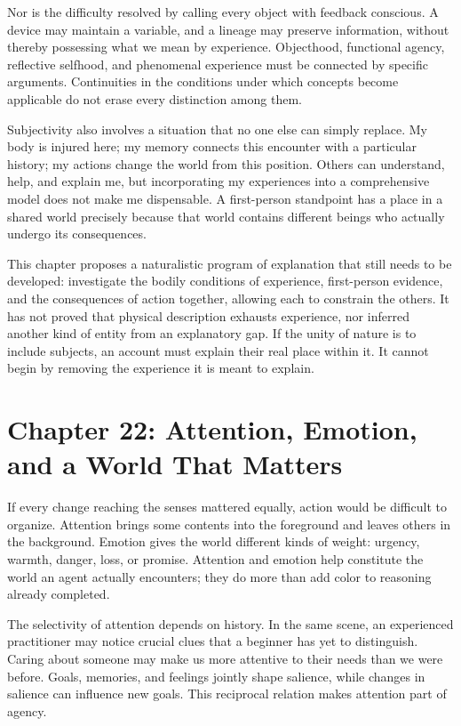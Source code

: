 \documentclass[
  english,
  11pt,
  oneside]{book}
\begin{document}
Nor is the difficulty resolved by calling every object with feedback conscious. A device may maintain a variable, and a lineage may preserve information, without thereby possessing what we mean by experience. Objecthood, functional agency, reflective selfhood, and phenomenal experience must be connected by specific arguments. Continuities in the conditions under which concepts become applicable do not erase every distinction among them.

Subjectivity also involves a situation that no one else can simply replace. My body is injured here; my memory connects this encounter with a particular history; my actions change the world from this position. Others can understand, help, and explain me, but incorporating my experiences into a comprehensive model does not make me dispensable. A first-person standpoint has a place in a shared world precisely because that world contains different beings who actually undergo its consequences.

\begingroup{}

This chapter proposes a naturalistic program of explanation that still needs to be developed: investigate the bodily conditions of experience, first-person evidence, and the consequences of action together, allowing each to constrain the others. It has not proved that physical description exhausts experience, nor inferred another kind of entity from an explanatory gap. If the unity of nature is to include subjects, an account must explain their real place within it. It cannot begin by removing the experience it is meant to explain.

\par\endgroup

\chapter{Chapter 22: Attention, Emotion, and a World That Matters}\label{ph-ch-22}

If every change reaching the senses mattered equally, action would be difficult to organize. Attention brings some contents into the foreground and leaves others in the background. Emotion gives the world different kinds of weight: urgency, warmth, danger, loss, or promise. Attention and emotion help constitute the world an agent actually encounters; they do more than add color to reasoning already completed.

The selectivity of attention depends on history. In the same scene, an experienced practitioner may notice crucial clues that a beginner has yet to distinguish. Caring about someone may make us more attentive to their needs than we were before. Goals, memories, and feelings jointly shape salience, while changes in salience can influence new goals. This reciprocal relation makes attention part of agency.
\end{document}
